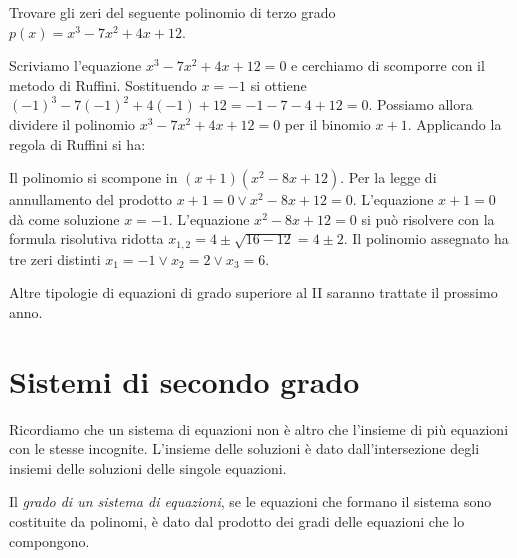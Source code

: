 \begin{esempio}
Trovare gli zeri del seguente polinomio di terzo grado $p(x)=x^3-7x^2+4x+12$.

Scriviamo l'equazione $x^3-7x^2+4x+12=0$ e cerchiamo di scomporre con il metodo 
di Ruffini. Sostituendo $x=-1$ si ottiene 
$(-1)^3-7(-1)^2+4(-1)+12=-1-7-4+12=0$. 
Possiamo allora dividere il polinomio $x^3-7x^2+4x+12=0$ per il binomio $x+1$. 
Applicando la regola di Ruffini si ha:
\begin{center}

\end{center}
Il polinomio si scompone in $(x+1)(x^2-8x+12)$. Per la legge di annullamento 
del 
prodotto $x+1=0\vee x^2-8x+12=0$. L'equazione $x+1=0$ dà come soluzione $x=-1$. 
L'equazione $x^2-8x+12=0$ si può risolvere con la formula risolutiva ridotta 
$x_{1,2}=4\pm \sqrt{16-12}=4\pm 2$. Il polinomio assegnato ha tre zeri distinti 
$x_1=-1\vee x_2=2\vee x_3=6$.
\end{esempio}


Altre tipologie di equazioni di grado superiore al II saranno trattate il 
prossimo anno.

\section{Sistemi di secondo grado}
\label{sec:eq2gr_sistemi}

Ricordiamo che un sistema di equazioni non è altro che l'insieme di più 
equazioni con le stesse incognite. L'insieme delle soluzioni è dato 
dall'intersezione degli insiemi delle soluzioni delle singole equazioni.

\begin{definizione}
Il \emph{grado di un sistema di equazioni}, se le equazioni che formano il 
sistema sono costituite da polinomi, è dato dal prodotto dei gradi delle 
equazioni che lo compongono.
\end{definizione}

